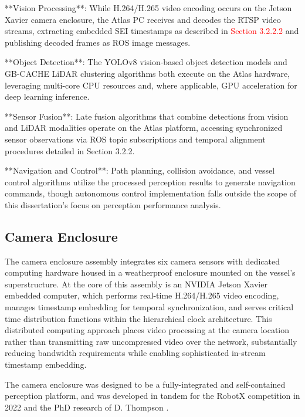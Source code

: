 \documentclass{erauthesis}
\begin{document}
**Vision Processing**: While H.264/H.265 video encoding occurs on the Jetson Xavier camera enclosure, the Atlas PC receives and decodes the RTSP video streams, extracting embedded SEI timestamps as described in \textcolor{red}{Section 3.2.2.2} and publishing decoded frames as ROS image messages.

**Object Detection**: The YOLOv8 vision-based object detection models and GB-CACHE LiDAR clustering algorithms both execute on the Atlas hardware, leveraging multi-core CPU resources and, where applicable, GPU acceleration for deep learning inference.

**Sensor Fusion**: Late fusion algorithms that combine detections from vision and LiDAR modalities operate on the Atlas platform, accessing synchronized sensor observations via ROS topic subscriptions and temporal alignment procedures detailed in Section 3.2.2.

**Navigation and Control**: Path planning, collision avoidance, and vessel control algorithms utilize the processed perception results to generate navigation commands, though autonomous control implementation falls outside the scope of this dissertation's focus on perception performance analysis.

\subsection{Camera Enclosure} \label{comp:camera_enclosure}


The camera enclosure assembly integrates six camera sensors with dedicated computing hardware housed in a weatherproof enclosure mounted on the vessel's superstructure. At the core of this assembly is an NVIDIA Jetson Xavier embedded computer, which performs real-time H.264/H.265 video encoding, manages timestamp embedding for temporal synchronization, and serves critical time distribution functions within the hierarchical clock architecture. This distributed computing approach places video processing at the camera location rather than transmitting raw uncompressed video over the network, substantially reducing bandwidth requirements while enabling sophisticated in-stream timestamp embedding.

The camera enclosure was designed to be a fully-integrated and self-contained perception platform, and was developed in tandem for the RobotX competition in 2022 and the PhD research of D. Thompson \cite{thompson2023}.
\end{document}
